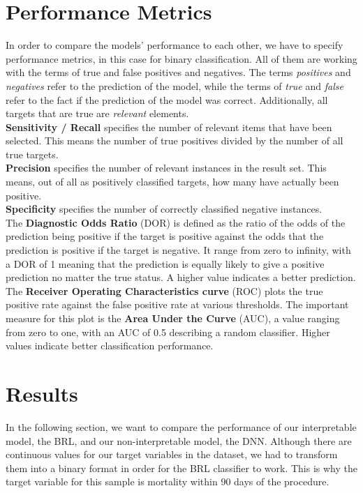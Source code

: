 \documentclass[conference,comsoc]{IEEEtran}
\begin{document}
\section{Performance Metrics}
In order to compare the models' performance to each other, we have to specify performance metrics, in this case for binary classification.
All of them are working with the terms of true and false positives and negatives.
The terms \emph{positives} and \emph{negatives} refer to the prediction of the model, while the terms of \emph{true} and \emph{false} refer to the fact if the prediction of the model was correct.
Additionally, all targets that are true are \emph{relevant} elements. \\
\textbf{Sensitivity / Recall} specifies the number of relevant items that have been selected.
This means the number of true positives divided by the number of all true targets. \\
\textbf{Precision} specifies the number of relevant instances in the result set.
This means, out of all as positively classified targets, how many have actually been positive. \\
\textbf{Specificity} specifies the number of correctly classified negative instances. \\
The \textbf{Diagnostic Odds Ratio} (DOR) is defined as the ratio of the odds of the prediction being positive if the target is positive against the odds that the prediction is positive if the target is negative.
It range from zero to infinity, with a DOR of 1 meaning that the prediction is equally likely to give a positive prediction no matter the true status.
A higher value indicates a better prediction. \\
The \textbf{Receiver Operating Characteristics curve} (ROC) plots the true positive rate against the false positive rate at various thresholds.
The important measure for this plot is the \textbf{Area Under the Curve} (AUC), a value ranging from zero to one, with an AUC of 0.5 describing a random classifier.
Higher values indicate better classification performance.


\section{Results}
\label{sec:results}
In the following section, we want to compare the performance of our interpretable model, the BRL, and our non-interpretable model, the DNN.
Although there are continuous values for our target variables in the dataset, we had to transform them into a binary format in order for the BRL classifier to work.
This is why the target variable for this sample is mortality within 90 days of the procedure.
\end{document}
